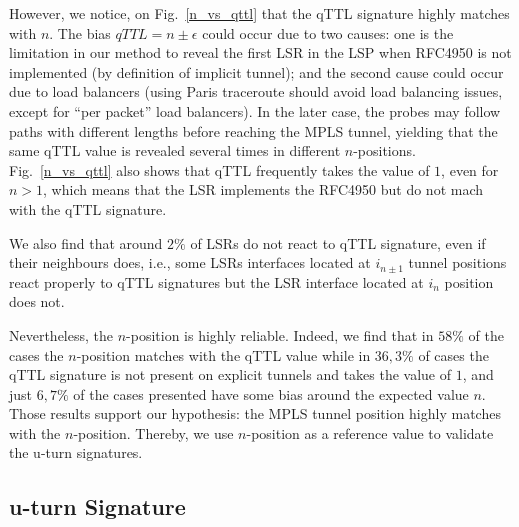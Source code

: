 However, we notice, on Fig.~\ref{n_vs_qttl} that the qTTL signature highly
matches with $n$.   The bias $\textit{qTTL}=n \pm \epsilon$ could occur due to
two causes: one is the limitation in our method to reveal the first LSR in the
LSP when RFC4950 is not implemented (by definition of implicit tunnel); and the
second cause could occur due to load balancers (using Paris traceroute should
avoid load balancing issues, except for ``per packet'' load balancers).
In the later case, the \traceroute probes may follow paths with different
lengths before reaching the MPLS tunnel, yielding that the same qTTL value is
revealed several times in different $n$-positions. Fig.~\ref{n_vs_qttl} also
shows that qTTL frequently takes the value of $1$, even for $n>1$, which means
that the LSR implements the RFC4950 but do not mach with the qTTL signature.


We also find that around $2\%$ of LSRs do not react to qTTL signature, even
if their neighbours does, i.e., some LSRs interfaces located at
$i_{n \pm 1}$ tunnel positions react properly to qTTL signatures but the LSR
interface located at $i_n$ position does not.


Nevertheless, the $n$-position is highly reliable. Indeed, we find that in
$58\%$ of the cases the $n$-position matches with the qTTL value while in
$36,3\%$ of cases the qTTL signature is not present on explicit tunnels and takes the value of $1$,
and just $6,7\%$ of the cases presented have some bias around the expected value
$n$. Those results support our hypothesis: the  MPLS tunnel position highly
matches with the $n$-position. Thereby,  we use $n$-position as a reference
value to validate the u-turn signatures.

\subsection{u-turn Signature}\label{validation.uturn}


